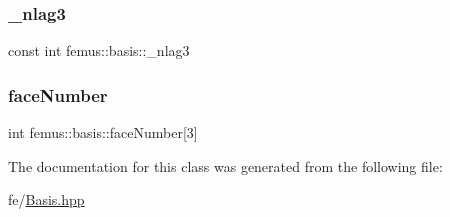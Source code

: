\mbox{\label{classfemus_1_1basis_afe89e7da4ba55df0492ee96f6bb04838}} 
\subsubsection{\texorpdfstring{\+\_\+nlag3}{\_nlag3}}
{\footnotesize\ttfamily const int femus\+::basis\+::\+\_\+nlag3}

\mbox{\label{classfemus_1_1basis_a21732cfb1bec4383fd050d218dfed070}} 
\subsubsection{\texorpdfstring{face\+Number}{faceNumber}}
{\footnotesize\ttfamily int femus\+::basis\+::face\+Number\mbox{[}3\mbox{]}}



The documentation for this class was generated from the following file\+:\begin{DoxyCompactItemize}
\item 
fe/\mbox{\hyperlink{_basis_8hpp}{Basis.\+hpp}}\end{DoxyCompactItemize}
